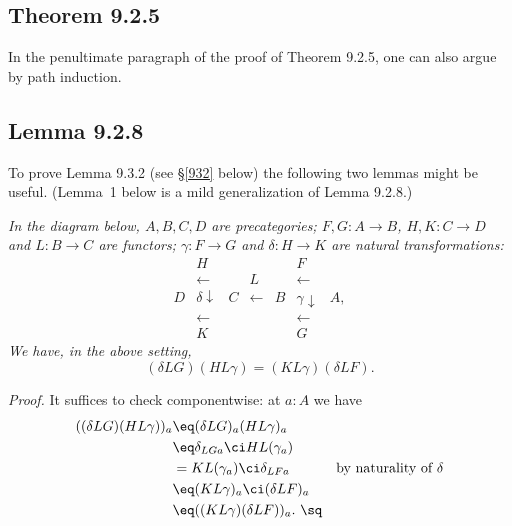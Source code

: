 \documentclass[12pt]{article}
\begin{document}
\subsection{Theorem 9.2.5}

In the penultimate paragraph of the proof of Theorem 9.2.5, one can also argue by path induction.


\subsection{Lemma 9.2.8}\label{928}

To prove Lemma 9.3.2 (see \S\ref{932} below) the following two lemmas might be useful. (Lemma~1 below is a mild generalization of Lemma 9.2.8.)

\nn{} \emph{In the diagram below, $A,B,C,D$ are precategories; $F,G:A\to B$, $H,K:C\to D$ and $L:B\to C$ are functors; $\gamma:F\to G$ and $\delta:H\to K$ are natural transformations:
$$
\begin{array}{ccccccc}
&H&&&&F\\
&\leftarrow&&L&&\leftarrow\\
D&\delta\downarrow&C&\leftarrow&B&\gamma\downarrow&A,\\
&\leftarrow&&&&\leftarrow\\
&K&&&&G
\end{array}
$$
We have, in the above setting,}
\begin{equation}\label{928a}
(\delta LG)(HL\gamma)=(KL\gamma)(\delta LF).
\end{equation}

\nn\emph{Proof.} It suffices to check componentwise: at $a:A$ we have
\begin{align*}
((\delta LG)(HL\gamma))_a
&\eq(\delta LG)_a(HL\gamma)_a\\
&\eq\delta_{LGa}\ci HL(\gamma_a)\\
&=KL(\gamma_a)\ci\delta_{LFa}&\text{by naturality of $\delta$}\\
&\eq(KL\gamma)_a\ci(\delta LF)_a\\
&\eq((KL\gamma)(\delta LF))_a.\ \sq
\end{align*}
\end{document}
